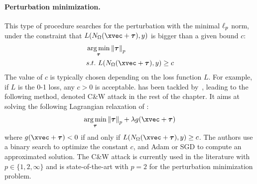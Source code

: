 \paragraph{Perturbation minimization.}
This type of procedure searches for the perturbation with the minimal $\ell_p $ norm, under the constraint that $L(\nn_\weights(\xvec + \adv), y)$ is bigger than a given bound $c$:
\begin{align}
  &\argmin_{\adv} \norm{\adv}_p \label{equation:ch2-normmin} \\
  &\st\ L(\nn_\weights(\xvec + \adv), y) \geq c \notag
\end{align}
The value of $c$ is typically chosen depending on the loss function $L$.
For example, if $L$ is the 0-1 loss, any $c > 0$ is acceptable.
 has been tackled by~\citet{carlini2017towards}, leading to the following method, denoted C\&W attack in the rest of the chapter.
It aims at solving the following Lagrangian relaxation of :
\begin{equation}
  \argmin_{\adv} \norm{\adv}_p + \lambda g(\xvec+\adv)
\end{equation}
where $g(\xvec + \adv)<0$ if and only if $L(\nn_\weights(\xvec + \adv),y) \geq c$.
The authors use a binary search to optimize the constant $c$, and Adam or SGD to compute an approximated solution.
The C\&W attack is currently used in the literature with $p \in \{1, 2, \infty \}$ and is state-of-the-art with $p=2$ for the perturbation minimization problem.





